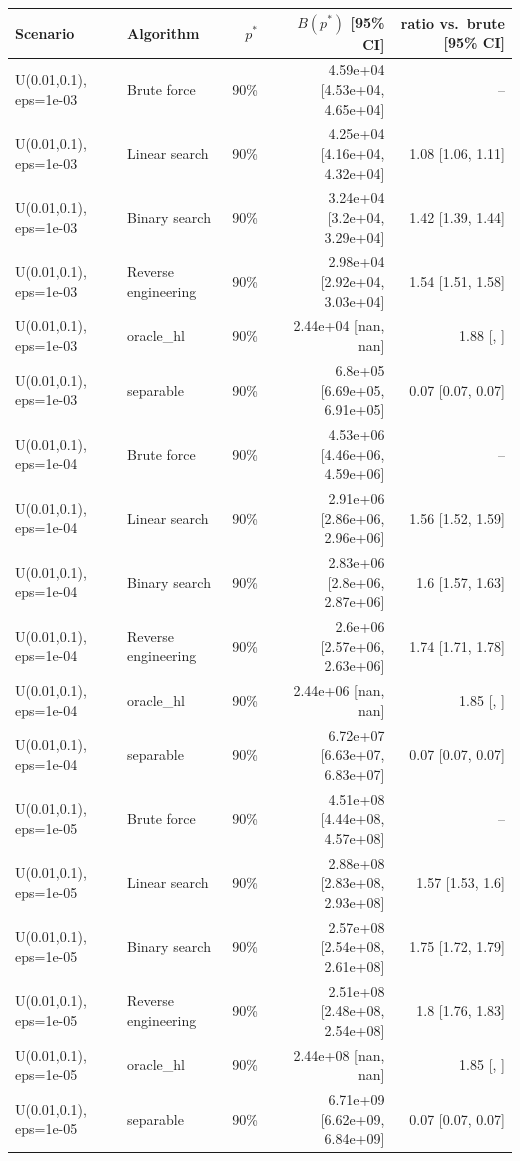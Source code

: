 \begin{tabular}{llrrr}
\toprule
Scenario & Algorithm & $p^*$ & $B(p^*)$ [95\% CI] & ratio vs.\ brute [95\% CI] \\
\midrule
U(0.01,0.1), eps=1e-03 & Brute force & 90\% & 4.59e+04 [4.53e+04, 4.65e+04] & -- \\
U(0.01,0.1), eps=1e-03 & Linear search & 90\% & 4.25e+04 [4.16e+04, 4.32e+04] & 1.08 [1.06, 1.11] \\
U(0.01,0.1), eps=1e-03 & Binary search & 90\% & 3.24e+04 [3.2e+04, 3.29e+04] & 1.42 [1.39, 1.44] \\
U(0.01,0.1), eps=1e-03 & Reverse engineering & 90\% & 2.98e+04 [2.92e+04, 3.03e+04] & 1.54 [1.51, 1.58] \\
U(0.01,0.1), eps=1e-03 & oracle_hl & 90\% & 2.44e+04 [nan, nan] & 1.88 [, ] \\
U(0.01,0.1), eps=1e-03 & separable & 90\% & 6.8e+05 [6.69e+05, 6.91e+05] & 0.07 [0.07, 0.07] \\
U(0.01,0.1), eps=1e-04 & Brute force & 90\% & 4.53e+06 [4.46e+06, 4.59e+06] & -- \\
U(0.01,0.1), eps=1e-04 & Linear search & 90\% & 2.91e+06 [2.86e+06, 2.96e+06] & 1.56 [1.52, 1.59] \\
U(0.01,0.1), eps=1e-04 & Binary search & 90\% & 2.83e+06 [2.8e+06, 2.87e+06] & 1.6 [1.57, 1.63] \\
U(0.01,0.1), eps=1e-04 & Reverse engineering & 90\% & 2.6e+06 [2.57e+06, 2.63e+06] & 1.74 [1.71, 1.78] \\
U(0.01,0.1), eps=1e-04 & oracle_hl & 90\% & 2.44e+06 [nan, nan] & 1.85 [, ] \\
U(0.01,0.1), eps=1e-04 & separable & 90\% & 6.72e+07 [6.63e+07, 6.83e+07] & 0.07 [0.07, 0.07] \\
U(0.01,0.1), eps=1e-05 & Brute force & 90\% & 4.51e+08 [4.44e+08, 4.57e+08] & -- \\
U(0.01,0.1), eps=1e-05 & Linear search & 90\% & 2.88e+08 [2.83e+08, 2.93e+08] & 1.57 [1.53, 1.6] \\
U(0.01,0.1), eps=1e-05 & Binary search & 90\% & 2.57e+08 [2.54e+08, 2.61e+08] & 1.75 [1.72, 1.79] \\
U(0.01,0.1), eps=1e-05 & Reverse engineering & 90\% & 2.51e+08 [2.48e+08, 2.54e+08] & 1.8 [1.76, 1.83] \\
U(0.01,0.1), eps=1e-05 & oracle_hl & 90\% & 2.44e+08 [nan, nan] & 1.85 [, ] \\
U(0.01,0.1), eps=1e-05 & separable & 90\% & 6.71e+09 [6.62e+09, 6.84e+09] & 0.07 [0.07, 0.07] \\

\end{tabular}
